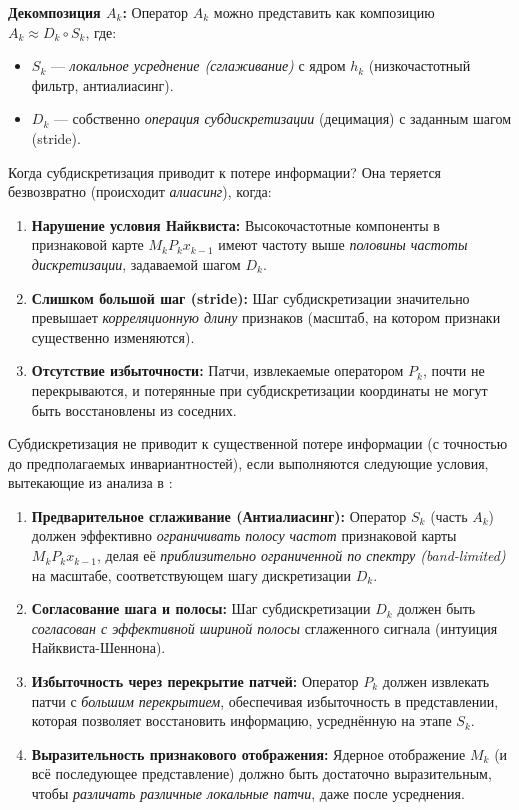 \documentclass[../NDCNNAI_main.tex]{subfiles}
\begin{document}
\textbf{Декомпозиция \(A_k\):} Оператор \(A_k\) можно представить как композицию \(A_k \approx D_k \circ S_k\), где:
\begin{itemize}
    \item \(S_k\) --- \emph{локальное усреднение (сглаживание)} с ядром \(h_k\) (низкочастотный фильтр, антиалиасинг).
    \item \(D_k\) --- собственно \emph{операция субдискретизации} (децимация) с заданным шагом (stride).
\end{itemize}

Когда субдискретизация приводит к потере информации?
Она теряется безвозвратно (происходит \emph{алиасинг}), когда:
\begin{enumerate}
    \item \textbf{Нарушение условия Найквиста:} Высокочастотные компоненты в признаковой карте \(M_k P_k x_{k-1}\) имеют частоту выше \emph{половины частоты дискретизации}, задаваемой шагом \(D_k\).
    \item \textbf{Слишком большой шаг (stride):} Шаг субдискретизации значительно превышает \emph{корреляционную длину} признаков (масштаб, на котором признаки существенно изменяются).
    \item \textbf{Отсутствие избыточности:} Патчи, извлекаемые оператором \(P_k\), почти не перекрываются, и потерянные при субдискретизации координаты не могут быть восстановлены из соседних.
\end{enumerate}

Субдискретизация не приводит к существенной потере информации (с точностью до предполагаемых инвариантностей), если выполняются следующие условия, вытекающие из анализа в \cite{Bietti_Group}:
\begin{enumerate}
    \item \textbf{Предварительное сглаживание (Антиалиасинг):} Оператор \(S_k\) (часть \(A_k\)) должен эффективно \emph{ограничивать полосу частот} признаковой карты \(M_k P_k x_{k-1}\), делая её \emph{приблизительно ограниченной по спектру (band-limited)} на масштабе, соответствующем шагу дискретизации \(D_k\).
    \item \textbf{Согласование шага и полосы:} Шаг субдискретизации \(D_k\) должен быть \emph{согласован с эффективной шириной полосы} сглаженного сигнала (интуиция Найквиста-Шеннона).
    \item \textbf{Избыточность через перекрытие патчей:} Оператор \(P_k\) должен извлекать патчи с \emph{большим перекрытием}, обеспечивая избыточность в представлении, которая позволяет восстановить информацию, усреднённую на этапе \(S_k\).
    \item \textbf{Выразительность признакового отображения:} Ядерное отображение \(M_k\) (и всё последующее представление) должно быть достаточно выразительным, чтобы \emph{различать различные локальные патчи}, даже после усреднения.
\end{enumerate}
\end{document}
